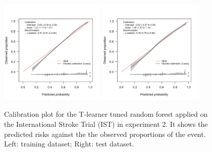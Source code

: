 \begin{figure}[htbp]
\centering
\includegraphics[width=0.45\textwidth]{img/results_IST/IST_tuned_rf_tlearner_train_calibration_plot.png}
\includegraphics[width=0.45\textwidth]{img/results_IST/IST_tuned_rf_tlearner_test_calibration_plot.png}
\caption{Calibration plot for the T-learner tuned random forest applied on the International Stroke Trial (IST) in experiment 2. It shows the predicted risks against the the observed proportions of the event. Left: training dataset; Right: test dataset.}
\label{fig:calibration_IST_tuned_rf}
\end{figure}


